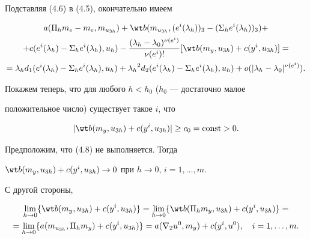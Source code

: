 Подставляя (4.6) в (4.5), окончательно имеем


\begin{multline}


a(\Pi_h m_e-m_e,m_{u_{3h}})+\wt b(m_{u_{3h}},(e^i(\lambda_h))_3


-(\Sigma_h e^i(\lambda_h))_3)+ \\


%


+c(e^i(\lambda_h)-\Sigma_h e^i(\lambda_h),u_h)


-\frac{(\lambda_h-\lambda_0)^{\nu(e^i)}}{\nu(e^i)!}


[\wt b(m_y,u_{3h})+c(y^i,u_{3h})]= \\


%


=\lambda_h d_1(e^i(\lambda_h)-\Sigma_h e^i(\lambda_h),u_h)


+{\lambda_h}^2 d_2(e^i(\lambda_h)-\Sigma_h e^i(\lambda_h),u_h)+


o(|\lambda_h-\lambda_0|^{\nu(e^i)}).


\end{multline}





Покажем теперь, что для любого $h<h_0$ ($h_0$ --- достаточно малое


положительное число) существует такое $i$, что


\begin{equation}


|\wt b(m_y,u_{3h})+c(y^i,u_{3h})|\ge c_0=\const>0.


\end{equation}


Предположим, что (4.8) не выполняется. Тогда


$\wt b(m_y,u_{3h})+c(y^i,u_{3h})\to 0$ при $ h\to 0$, $i=1,\dotsc,m.$


С другой стороны,


\begin{multline*}


\lim_{h\to 0}\{\wt b(m_y,u_{3h})+c(y^i,u_{3h})\}=


\lim_{h\to 0}\{\wt b(\Pi_h m_y,u_{3h})+c(y^i,u_{3h})\}= \\


%


=\lim_{h\to 0}\{a(m_{u_{3h}},\Pi_h m_y)+c(y^i,u_{3h})\}=


a(\nabla_2 u^0,m_y)+c(y^i,u^0),\quad i=1,\dotsc,m.


\end{multline*}



